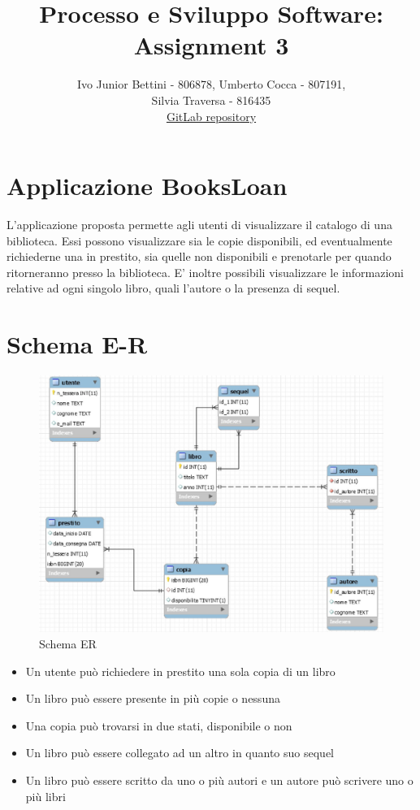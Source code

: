 \documentclass[a4paper,10pt]{article}
\title{Processo e Sviluppo Software: Assignment 3}
\author{Ivo Junior Bettini - 806878, Umberto Cocca - 807191, \\Silvia Traversa - 816435\\
\href{https://gitlab.com/s.traversa/2019_assignment3_booksloan}{GitLab repository}}
\date{}
\begin{document}
\maketitle 


\section*{Applicazione BooksLoan}
L'applicazione proposta permette agli utenti di visualizzare il catalogo di una biblioteca. Essi possono visualizzare sia le copie disponibili, ed eventualmente richiederne una in prestito, sia quelle non disponibili e prenotarle per quando ritorneranno presso la biblioteca.
E' inoltre possibili visualizzare le informazioni relative ad ogni singolo libro, quali l'autore o la presenza di sequel. 

\section*{Schema E-R}

\begin{figure}[H]
	\centering
	\includegraphics[width=0.7\linewidth]{images/ERdiagram}
	\caption[Schema ER]{Schema ER}
	\label{fig:re}
\end{figure}

\begin{itemize}
	\item Un utente può richiedere in prestito una sola copia di un libro
	\item Un libro può essere presente in più copie o nessuna
	\item Una copia può trovarsi in due stati, disponibile o non
	\item Un libro può essere collegato ad un altro in quanto suo sequel
	\item Un libro può essere scritto da uno o più autori e un autore può scrivere uno o più libri
\end{itemize}
\end{document}
